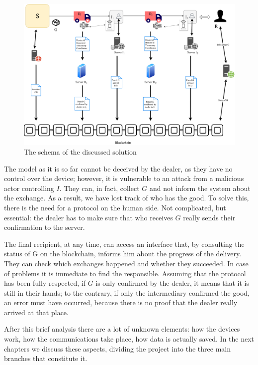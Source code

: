 \begin{figure}[h]
    \centering
    \includegraphics[width=\textwidth]{figures/solutionSansSerif.pdf}
    \caption{The schema of the discussed solution}
    \label{fig:solution}
\end{figure}

The model as it is so far cannot be deceived by the dealer, as they have no control over the device; however, it is vulnerable to an attack from a malicious actor controlling $I$. They can, in fact, collect $G$ and not inform the system about the exchange. As a result, we have lost track of who has the good. To solve this, there is the need for a protocol on the human side. Not complicated, but essential: the dealer has to make sure that who receives $G$ really sends their confirmation to the server. 

The final recipient, at any time, can access an interface that, by consulting the status of G on the blockchain, informs him about the progress of the delivery. They can check which exchanges happened and whether they succeeded. In case of problems it is immediate to find the responsible. Assuming that the protocol has been fully respected, if $G$ is only confirmed by the dealer, it means that it is still in their hands; to the contrary, if only the intermediary confirmed the good, an error must have occurred, because there is no proof that the dealer really arrived at that place.

After this brief analysis there are a lot of unknown elements: how the devices work, how the communications take place, how data is actually saved. In the next chapters we discuss these aspects, dividing the project into the three main branches that constitute it.

